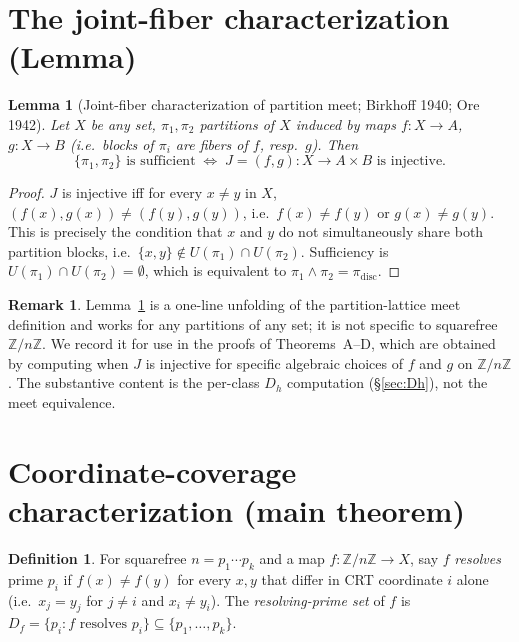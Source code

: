 \documentclass[11pt,reqno]{amsart}
\theoremstyle{plain}
\newtheorem{lemma}[theorem]{Lemma}
\theoremstyle{definition}
\newtheorem{definition}[theorem]{Definition}
\newtheorem{remark}[theorem]{Remark}
\newcommand{\Z}{\mathbb{Z}}
\newcommand{\Zn}{\Z/n\Z}
\newcommand{\meet}{\wedge}
\newcommand{\disc}{\mathrm{disc}}
\begin{document}
\section{The joint-fiber characterization (Lemma)} \label{sec:lemma}

\begin{lemma}[Joint-fiber characterization of partition meet; Birkhoff 1940; Ore 1942] \label{lem:meet}
Let $X$ be any set, $\pi_1, \pi_2$ partitions of $X$ induced by maps
$f \colon X \to A$, $g \colon X \to B$ (i.e.\ blocks of $\pi_i$ are
fibers of $f$, resp.\ $g$). Then
\[
\{\pi_1, \pi_2\} \text{ is sufficient}
\;\iff\;
J = (f, g) \colon X \to A \times B \text{ is injective.}
\]
\end{lemma}

\begin{proof}
$J$ is injective iff for every $x \neq y$ in $X$,
$(f(x), g(x)) \neq (f(y), g(y))$, i.e.\ $f(x) \neq f(y)$ or
$g(x) \neq g(y)$. This is precisely the condition that $x$ and $y$
do not simultaneously share both partition blocks, i.e.\
$\{x, y\} \notin U(\pi_1) \cap U(\pi_2)$. Sufficiency is
$U(\pi_1) \cap U(\pi_2) = \emptyset$, which is equivalent to
$\pi_1 \meet \pi_2 = \pi_{\disc}$.
\end{proof}

\begin{remark}
Lemma~\ref{lem:meet} is a one-line unfolding of the partition-lattice
meet definition and works for any partitions of any set; it is not
specific to squarefree $\Zn$. We record it for use in the proofs of
Theorems~A--D, which are obtained by computing when $J$ is injective
for specific algebraic choices of $f$ and $g$ on $\Zn$. The
substantive content is the per-class $D_h$ computation
(\S\ref{sec:Dh}), not the meet equivalence.
\end{remark}

\section{Coordinate-coverage characterization (main theorem)} \label{sec:cc}

\begin{definition} \label{def:resolves}
For squarefree $n = p_1 \cdots p_k$ and a map $f \colon \Zn \to X$,
say $f$ \emph{resolves} prime $p_i$ if $f(x) \neq f(y)$ for every
$x, y$ that differ in CRT coordinate $i$ alone (i.e.\ $x_j = y_j$ for
$j \neq i$ and $x_i \neq y_i$). The \emph{resolving-prime set} of $f$
is $D_f = \{p_i : f \text{ resolves } p_i\} \subseteq \{p_1, \ldots, p_k\}$.
\end{definition}
\end{document}
